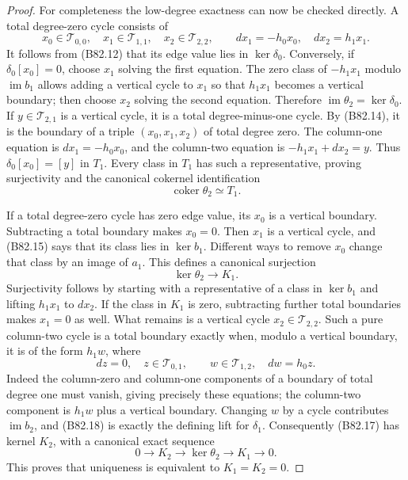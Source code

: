 \begin{proof}
For completeness the low-degree exactness can now be checked
directly. A total degree-zero cycle consists of
\[
 x_0\in\mathcal T_{0,0},\quad
 x_1\in\mathcal T_{1,1},\quad
 x_2\in\mathcal T_{2,2},\qquad
             dx_1=-h_0x_0,\quad dx_2=h_1x_1.             \tag{B82.15}
\]
It follows from (B82.12) that its edge value lies in
$\ker\delta_0$. Conversely, if $\delta_0[x_0]=0$, choose $x_1$
solving the first equation. The zero class of $-h_1x_1$ modulo
$\operatorname{im}b_1$ allows adding a vertical cycle to $x_1$
so that $h_1x_1$ becomes a vertical boundary; then choose $x_2$
solving the second equation. Therefore
$\operatorname{im}\theta_2=\ker\delta_0$.
If $y\in\mathcal T_{2,1}$ is a vertical cycle, it is a total
degree-minus-one cycle. By (B82.14), it is the boundary of a
triple $(x_0,x_1,x_2)$ of total degree zero. The column-one
equation is $dx_1=-h_0x_0$, and the column-two equation is
$-h_1x_1+dx_2=y$. Thus $\delta_0[x_0]=[y]$ in $T_1$.
Every class in $T_1$ has such a representative, proving surjectivity
and the canonical cokernel identification
\[
                    \operatorname{coker}\theta_2\simeq T_1.
                                                        \tag{B82.16}
\]

If a total degree-zero cycle has zero edge value, its $x_0$ is a
vertical boundary. Subtracting a total boundary makes $x_0=0$.
Then $x_1$ is a vertical cycle, and (B82.15) says that its class
lies in $\ker b_1$. Different ways to remove $x_0$ change that
class by an image of $a_1$. This defines a canonical surjection
\[
                       \ker\theta_2\longrightarrow K_1. \tag{B82.17}
\]
Surjectivity follows by starting with a representative of a class
in $\ker b_1$ and lifting $h_1x_1$ to $dx_2$.
If the class in $K_1$ is zero, subtracting further total boundaries
makes $x_1=0$ as well. What remains is a vertical cycle
$x_2\in\mathcal T_{2,2}$. Such a pure column-two cycle is a total
boundary exactly when, modulo a vertical boundary, it is of the form
$h_1w$, where
\[
 dz=0,\quad z\in\mathcal T_{0,1},\qquad
 w\in\mathcal T_{1,2},\quad dw=h_0z.                     \tag{B82.18}
\]
Indeed the column-zero and column-one components of a boundary
of total degree one must vanish, giving precisely these equations;
the column-two component is $h_1w$ plus a vertical boundary.
Changing $w$ by a cycle contributes $\operatorname{im}b_2$,
and (B82.18) is exactly the defining lift for $\delta_1$.
Consequently (B82.17) has kernel $K_2$, with a canonical exact
sequence
\[
             0\longrightarrow K_2\longrightarrow\ker\theta_2
                     \longrightarrow K_1\longrightarrow0.   \tag{B82.19}
\]
This proves that uniqueness is equivalent to $K_1=K_2=0$.


\end{proof}
